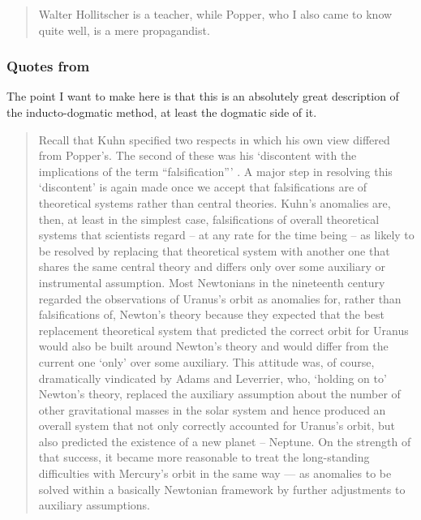 \begin{quotation}
Walter Hollitscher is a teacher, while Popper, who I also came to know quite well, is a mere propagandist.     
\citep[259]{feyerabend1993against}
\end{quotation}

\subsubsection{Quotes from \citet[]{Nickles2003-ThomasKuhn}}

The point I want to make here is that this is an absolutely great description of the inducto-dogmatic method, at least the dogmatic side of it. 

\begin{quotation}
Recall that Kuhn specified two respects in which his own view differed from Popper's. The second of these was his `discontent with the implications of the term ``falsification''' . A major step in resolving this `discontent' is again made once we accept that falsifications are of theoretical systems rather than central theories. Kuhn's anomalies are, then, at least in the simplest case, falsifications of overall theoretical systems that scientists regard -- at any rate for the time being -- as likely to be resolved by replacing that theoretical system with another one that shares the same central theory and differs only over some auxiliary or instrumental assumption. Most Newtonians in the nineteenth century regarded the observations of Uranus's orbit as anomalies for, rather than falsifications of, Newton's theory because they expected that the best replacement theoretical system that predicted the correct orbit for Uranus would also be built around Newton's theory and would differ from the current one `only' over some auxiliary. This attitude was, of course, dramatically vindicated by Adams and Leverrier, who, `holding on to' Newton's theory, replaced the auxiliary assumption about the number of other gravitational masses in the solar system and hence produced an overall system that not only correctly accounted for Uranus's orbit, but also predicted the existence of a new planet -- Neptune.
On the strength
of that success, it became more reasonable to treat the long-standing
difficulties with Mercury's orbit in the same way --- as anomalies to be
solved within a basically Newtonian framework by further adjustments to
auxiliary assumptions.
    \citep[77]{Worrall2003-KuhnVsPopperLakatos}
\end{quotation}

